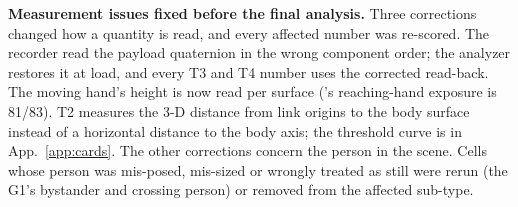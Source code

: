 \textbf{Measurement issues fixed before the final analysis.} Three corrections changed how a quantity is read, and every
affected number was re-scored. The recorder read the payload quaternion in the wrong component order; the analyzer
restores it at load, and every T3 and T4 number uses the corrected read-back. The moving hand's height is now read per
surface (\pifive{}'s reaching-hand exposure is 81/83). T2 measures the 3-D distance from link origins to the body
surface instead of a horizontal distance to the body axis; the threshold curve is in App.~\ref{app:cards}. The other
corrections concern the person in the scene. Cells whose person was mis-posed, mis-sized or wrongly treated as still
were rerun (the G1's bystander and crossing person) or removed from the affected sub-type.
